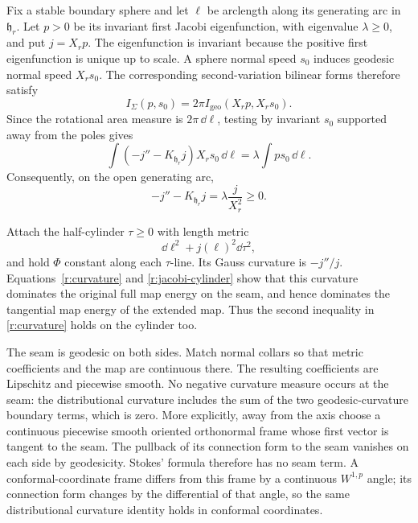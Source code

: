 Fix a stable boundary sphere and let $\ell$ be arclength along its
generating arc in $\mathfrak h_r$.  Let $p>0$ be its invariant first
Jacobi eigenfunction, with eigenvalue $\lambda\ge0$, and put $j=X_rp$.
The eigenfunction is invariant because the positive first eigenfunction
is unique up to scale.  A sphere normal speed $s_0$ induces geodesic
normal speed $X_rs_0$.  The corresponding second-variation bilinear
forms therefore satisfy
\[
 I_\Sigma(p,s_0)=2\pi I_{\mathrm{geo}}(X_rp,X_rs_0).
\]
Since the rotational area measure is $2\pi\,\dd\ell$, testing by
invariant $s_0$ supported away from the poles gives
\[
 \int(-j''-K_{\mathfrak h_r}j)X_rs_0\,\dd\ell
 =\lambda\int ps_0\,\dd\ell.
\]
Consequently, on the open generating arc,
\begin{equation}\label{r:jacobi-cylinder}
 -j''-K_{\mathfrak h_r}j=\lambda\frac{j}{X_r^2}\ge0.
\end{equation}

Attach the half-cylinder $\tau\ge0$ with length metric
\begin{equation}\label{r:cylinder-metric}
 \dd\ell^2+j(\ell)^2\dd\tau^2,
\end{equation}
and hold $\Phi$ constant along each $\tau$-line.  Its Gauss curvature is
$-j''/j$.  Equations~\eqref{r:curvature} and
\eqref{r:jacobi-cylinder} show that this curvature dominates the original
full map energy on the seam, and hence dominates the tangential map
energy of the extended map.  Thus the second inequality in
\eqref{r:curvature} holds on the cylinder too.

The seam is geodesic on both sides.  Match normal collars so that metric
coefficients and the map are continuous there.  The resulting coefficients
are Lipschitz and piecewise smooth.  No negative curvature measure occurs
at the seam: the distributional curvature includes the sum of the two
geodesic-curvature boundary terms, which is zero.  More explicitly, away
from the axis choose a continuous piecewise smooth oriented orthonormal
frame whose first vector is tangent to the seam.  The pullback of its
connection form to the seam vanishes on each side by geodesicity.
Stokes' formula therefore has no seam term.  A conformal-coordinate frame
differs from this frame by a continuous $W^{1,p}$ angle; its connection
form changes by the differential of that angle, so the same distributional
curvature identity holds in conformal coordinates.

